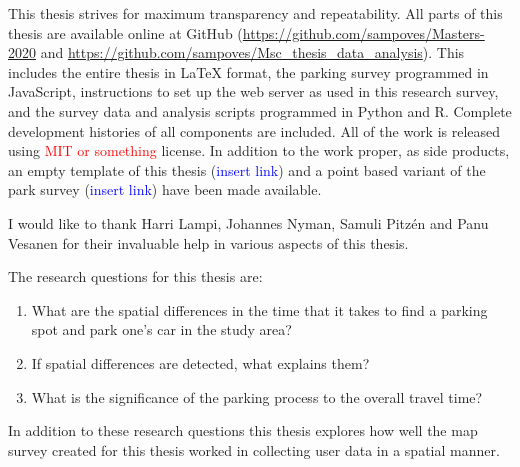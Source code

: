 This thesis strives for maximum transparency and repeatability. All parts of this thesis are available online at GitHub (\textcolor{blue}{\url{https://github.com/sampoves/Masters-2020}} and \textcolor{blue}{\url{https://github.com/sampoves/Msc_thesis_data_analysis}}). This includes the entire thesis in LaTeX format, the parking survey programmed in JavaScript, instructions to set up the web server as used in this research survey, and the survey data and analysis scripts programmed in Python and R. Complete development histories of all components are included. All of the work is released using \textcolor{red}{MIT or something} license. In addition to the work proper, as side products, an empty template of this thesis (\textcolor{blue}{insert link}) and a point based variant of the park survey (\textcolor{blue}{insert link}) have been made available.

I would like to thank Harri Lampi, Johannes Nyman, Samuli Pitzén and Panu Vesanen for their invaluable help in various aspects of this thesis.

\bigskip
\noindent
The research questions for this thesis are:

\begin{spacing}{1}
    \begin{enumerate}[label=\Roman*]
      \item What are the spatial differences in the time that it takes to find a parking spot and park one’s car in the study area?
      \item If spatial differences are detected, what explains them?
      \item What is the significance of the parking process to the overall travel time?
    \end{enumerate}
\end{spacing}
\bigskip
In addition to these research questions this thesis explores how well the map survey created for this thesis worked in collecting user data in a spatial manner.